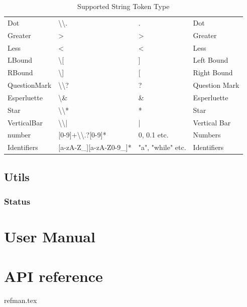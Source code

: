 \documentclass{report}
\newcommand{\+}{}
\begin{document}
\begin{table}[hb!]
\begin{tabular}{l|lll}
            Dot          & \textbackslash{}\textbackslash{}.                      & .                 & Dot            \\
            Greater      & \textgreater{}                                         & \textgreater{}    & Greater        \\
            Less         & \textless{}                                            & \textless{}       & Less           \\
            LBound       & \textbackslash{}[                                      & {]}               & Left Bound     \\
            RBound       & \textbackslash{}]                                      & {[}               & Right Bound    \\
            QuestionMark & \textbackslash{}\textbackslash{}?                      & ?                 & Question Mark  \\
            Esperluette  & \textbackslash{}\&                                     & \&                & Esperluette    \\
            Star         & \textbackslash{}\textbackslash{}*                      & *                 & Star           \\
            VerticalBar  & \textbackslash{}\textbackslash{}|                      & |                 & Vertical Bar   \\
            number       & {[}0-9{]}+\textbackslash{}\textbackslash{}.?{[}0-9{]}* & 0, 0.1 etc.       & Numbers        \\
            Identifiers  & {[}a-zA-Z\_{]}{[}a-zA-Z0-9\_{]}*                       & "a", "while" etc. & Identifiers    \\ \hline
        \end{tabular}
        \caption{Supported String Token Type}
        \label{tab:supported_lexical_token_list}
    \end{table}

    \subsection{Utils}\label{subsec:utils}

    \subsubsection{Status }


    \section{User Manual}\label{sec:user-manual}

    \appendix


    \section{API reference }
    {refman.tex}

    \printindex
\end{document}
